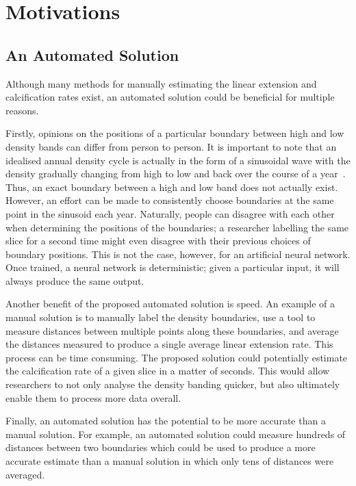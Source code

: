 \section{Motivations}


\subsection{An Automated Solution}

Although many methods for manually estimating the linear extension and calcification rates exist, an automated solution could be beneficial for multiple reasons.

Firstly, opinions on the positions of a particular boundary between high and low density bands can differ from person to person. It is important to note that an idealised annual density cycle is actually in the form of a sinusoidal wave with the density gradually changing from high to low and back over the course of a year~\cite[p. 39]{coralsine}. Thus, an exact boundary between a high and low band does not actually exist. However, an effort can be made to consistently choose boundaries at the same point in the sinusoid each year. Naturally, people can disagree with each other when determining the positions of the boundaries; a researcher labelling the same slice for a second time might even disagree with their previous choices of boundary positions. This is not the case, however, for an artificial neural network. Once trained, a neural network is deterministic; given a particular input, it will always produce the same output.

Another benefit of the proposed automated solution is speed. An example of a manual solution is to manually label the density boundaries, use a tool to measure distances between multiple points along these boundaries, and average the distances measured to produce a single average linear extension rate. This process can be time consuming. The proposed solution could potentially estimate the calcification rate of a given slice in a matter of seconds. This would allow researchers to not only analyse the density banding quicker, but also ultimately enable them to process more data overall.

Finally, an automated solution has the potential to be more accurate than a manual solution. For example, an automated solution could measure hundreds of distances between two boundaries which could be used to produce a more accurate estimate than a manual solution in which only tens of distances were averaged.

